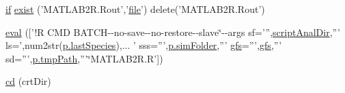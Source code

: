 \begin{DoxyCompactItemize}
\item 
\hyperlink{a00030_a01d55766b8058903dd360b4bda71f9f5}{if} \hyperlink{a00032_ab41b8dc78dee42a1a5e5a33d8bf6eeb3}{exist} ('M\-A\-T\-L\-A\-B2\-R.\-Rout','\hyperlink{a00068_a4e8353d6c62cf54bf4a1a8f63e56b8c3}{file}') delete('M\-A\-T\-L\-A\-B2\-R.\-Rout')
\item 
\hyperlink{a00032_ab4c95c2d6a84263412f5679a78b55e41}{eval} (\mbox{[}'!R C\-M\-D B\-A\-T\-C\-H-\/-\/no-\/save-\/-\/no-\/restore-\/-\/slave\char`\"{}-\/-\/args sf=''',\hyperlink{a00032_a2a07fff00b80967a40ae67d91fd31cb4}{script\-Anal\-Dir},''' ls=',num2str(\hyperlink{a00032_aad7be196243f3c9ca83dfee7c9111014}{p.\-last\-Species}),...
        ' sss=''',\hyperlink{a00032_aa671e3345005bd599e662bcaa115b18a}{p.\-sim\-Folder},''' \hyperlink{a00032_a5714ee99d309183e59b051e92e5a44d1}{gfs}=''',\hyperlink{a00032_a5714ee99d309183e59b051e92e5a44d1}{gfs},''' sd=''',\hyperlink{a00032_a1e5a4863ab2b87f923e1d19e2da1f5ac}{p.\-tmp\-Path},'''\char`\"{}M\-A\-T\-L\-A\-B2\-R.\-R'\mbox{]})
\item 
\hyperlink{a00032_a2160a514930abbfa9436b787b4cfc8ab}{cd} (crt\-Dir)
\end{DoxyCompactItemize}
